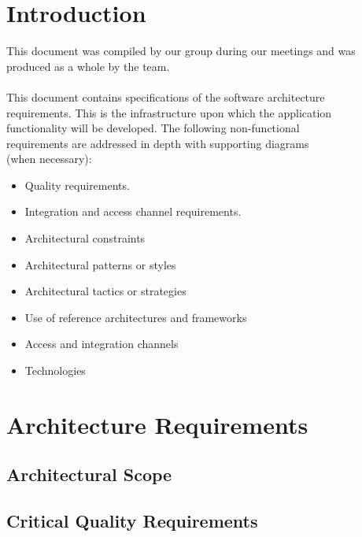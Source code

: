 \documentclass[a4paper,12pt,titlepage]{article}
\begin{document}



\newpage
\tableofcontents


\newpage
\section{Introduction}

This document was compiled by our group during our meetings and was produced as a whole by the team.\\\\

This document contains specifications of the software architecture 
\\requirements. This is the infrastructure upon which the application
\\ functionality will be developed. The following non-functional
\\ requirements are addressed in depth with supporting diagrams
\\(when necessary):

\begin{itemize}
	\item Quality requirements.
	\item Integration and access channel requirements.
	\item Architectural constraints
	\item Architectural patterns or styles
	\item Architectural tactics or strategies
	\item Use of reference architectures and frameworks
	\item Access and integration channels
	\item Technologies
\end{itemize}

\newpage

\section{Architecture Requirements}
\subsection{Architectural Scope}
\newpage
\subsection{Critical Quality Requirements}
\end{document}
